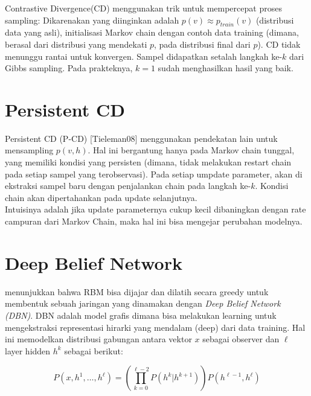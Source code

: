 Contrastive Divergence(CD) menggunakan trik untuk mempercepat proses sampling: Dikarenakan yang diinginkan adalah $p(v) \approx p_{train}(v)$ (distribusi data yang asli), initialisasi  Markov chain dengan contoh data training (dimana, berasal dari distribusi yang mendekati $p$, pada distribusi final dari $p$). CD tidak menunggu rantai untuk konvergen. Sampel didapatkan setalah langkah ke-$k$ dari Gibbs sampling. Pada prakteknya, $k=1$ sudah menghasilkan hasil yang baik.\\

\section{Persistent CD}

Persistent CD (P-CD) [Tieleman08] menggunakan pendekatan lain untuk mensampling $p(v,h)$. Hal ini bergantung hanya pada Markov chain tunggal, yang memiliki kondisi yang persisten (dimana, tidak melakukan restart chain pada setiap sampel yang terobservasi). Pada setiap umpdate parameter, akan di ekstraksi sampel baru dengan penjalankan chain pada langkah ke-$k$. Kondisi chain akan dipertahankan pada update selanjutnya.\\
Intuisinya adalah jika update parameternya cukup kecil dibaningkan dengan rate campuran dari Markov Chain, maka hal ini bisa mengejar perubahan modelnya.



\section{Deep Belief Network}

\cite{hinton2006fast} menunjukkan bahwa RBM bisa dijajar dan dilatih secara greedy untuk membentuk sebuah jaringan yang dinamakan dengan \textit{Deep Belief Network (DBN)}. DBN adalah model grafis dimana bisa melakukan learning untuk mengekstraksi representasi hirarki yang mendalam (deep) dari data training. Hal ini memodelkan distribusi gabungan antara vektor $x$ sebagai observer dan $\ell$ layer hidden $h^k$ sebagai berikut:

\begin{equation}
P(x, h^1, \ldots, h^{\ell}) = \left(\prod_{k=0}^{\ell-2} P(h^k|h^{k+1})\right) P(h^{\ell-1},h^{\ell})
\end{equation}

